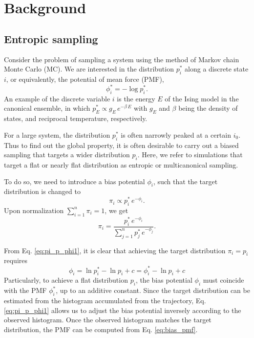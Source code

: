 \documentclass[reprint]{revtex4-1}
\begin{document}
\section{Background}



\subsection{Entropic sampling}

Consider the problem of sampling a system
using the method of Markov chain Monte Carlo (MC).
%
We are interested in the distribution $p^*_i$
along a discrete state $i$,
or equivalently, the potential of mean force (PMF),
%
\begin{equation}
\phi^*_i = -\log p^*_i.
\label{eq:pmf_def}
\end{equation}
%
An example of the discrete variable $i$
is the energy $E$ of the Ising model
in the canonical ensemble,
in which $p^*_E \propto g_E \, e^{-\beta \, E}$
with $g_E$ and $\beta$ being the density of states,
and reciprocal temperature, respectively.


For a large system,
the distribution $p^*_i$ is often
narrowly peaked at a certain $i_0$.
%
Thus to find out the global property,
it is often desirable to carry out
a biased sampling that targets
a wider distribution $p_i$.
%
Here, we refer to simulations that target
a flat or nearly flat distribution
as entropic or multicanonical sampling.



To do so, we need to introduce a bias potential $\phi_i$,
such that the target distribution is changed to
%
\begin{equation}
  \pi_i \propto p^*_i \, e^{-\phi_i}.
  \label{eq:pi_p_phi1}
\end{equation}
%
Upon normalization $\sum_{i = 1}^n \pi_i = 1$,
we get
%
\begin{equation}
  \pi_i =
  \frac{ p^*_i \, e^{-\phi_i} }
  { \sum_{j = 1}^n p^*_j \, e^{-\phi_j} }.
  \label{eq:pi_p_phi}
\end{equation}



From Eq. \eqref{eq:pi_p_phi1},
it is clear that achieving the target distribution
$\pi_i = p_i$ requires
%
\begin{equation}
\phi_i = \ln p^*_i - \ln p_i + c
=\phi^*_i - \ln p_i + c
\label{eq:bias_pmf}
\end{equation}
Particularly,
to achieve a flat distribution $p_i$,
the bias potential $\phi_i$
must coincide with the PMF $\phi^*_i$,
up to an additive constant.
%
Since the target distribution
can be estimated from the histogram
accumulated from the trajectory,
Eq. \eqref{eq:pi_p_phi1}
allows us to adjust the bias potential
inversely according to the observed histogram.
%
Once the observed histogram matches
the target distribution,
the PMF can be computed from Eq. \eqref{eq:bias_pmf}.
\end{document}

